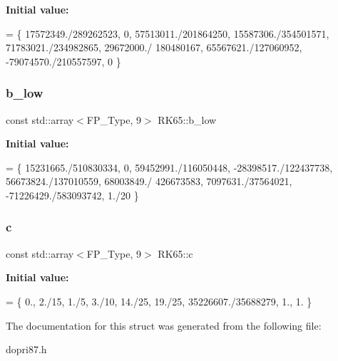 {\bfseries Initial value\+:}
\begin{DoxyCode}
= \{
    17572349./289262523,  0, 57513011./201864250, 15587306./354501571, 71783021./234982865, 29672000./
      180480167, 65567621./127060952, -79074570./210557597, 0
  \}
\end{DoxyCode}
\mbox{\label{structRK65_ad44441a4c4c7c2e0b52d3f42011445e5}} 
\subsubsection{\texorpdfstring{b\+\_\+low}{b\_low}}
{\footnotesize\ttfamily const std\+::array$<$F\+P\+\_\+\+Type, 9$>$ R\+K65\+::b\+\_\+low}

{\bfseries Initial value\+:}
\begin{DoxyCode}
= \{
    15231665./510830334, 0, 59452991./116050448, -28398517./122437738, 56673824./137010559, 68003849./
      426673583, 7097631./37564021, -71226429./583093742, 1./20
  \}
\end{DoxyCode}
\mbox{\label{structRK65_a5f2016f03bc04743bac86decbb929eeb}} 
\subsubsection{\texorpdfstring{c}{c}}
{\footnotesize\ttfamily const std\+::array$<$F\+P\+\_\+\+Type, 9$>$ R\+K65\+::c}

{\bfseries Initial value\+:}
\begin{DoxyCode}
= \{
    0., 2./15, 1./5, 3./10, 14./25, 19./25, 35226607./35688279, 1., 1.
  \}
\end{DoxyCode}


The documentation for this struct was generated from the following file\+:\begin{DoxyCompactItemize}
\item 
dopri87.\+h\end{DoxyCompactItemize}
